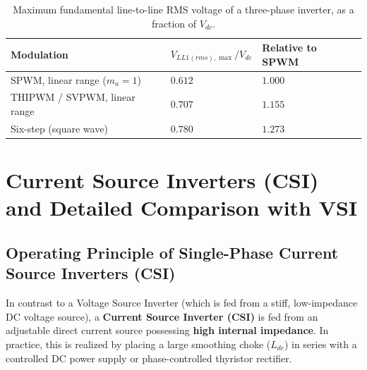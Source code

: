 \documentclass[11pt,a4paper]{article}
\let\origsection\section
\renewcommand{\section}{\Needspace{12\baselineskip}\origsection}
\let\origsubsection\subsection
\renewcommand{\subsection}{\Needspace{7\baselineskip}\origsubsection}
\begin{document}
\begin{table}[htbp]
\centering
\small
\caption{Maximum fundamental line-to-line RMS voltage of a three-phase inverter, as a fraction of $V_{dc}$.}
\label{tab:max_vll}
\begin{tabularx}{0.8\textwidth}{l Y Y}
\toprule
\textbf{Modulation} & $V_{LL1(rms),\max}/V_{dc}$ & \textbf{Relative to SPWM} \\
\midrule
SPWM, linear range ($m_a = 1$) & $0.612$ & $1.000$ \\
THIPWM / SVPWM, linear range & $0.707$ & $1.155$ \\
Six-step (square wave) & $0.780$ & $1.273$ \\
\bottomrule
\end{tabularx}
\end{table}


\section{Current Source Inverters (CSI) and Detailed Comparison with VSI}

\subsection{Operating Principle of Single-Phase Current Source Inverters (CSI)}

In contrast to a Voltage Source Inverter (which is fed from a stiff, low-impedance DC voltage source), a \textbf{Current Source Inverter (CSI)} is fed from an adjustable direct current source possessing \textbf{high internal impedance}. In practice, this is realized by placing a large smoothing choke ($L_{dc}$) in series with a controlled DC power supply or phase-controlled thyristor rectifier.
\end{document}
